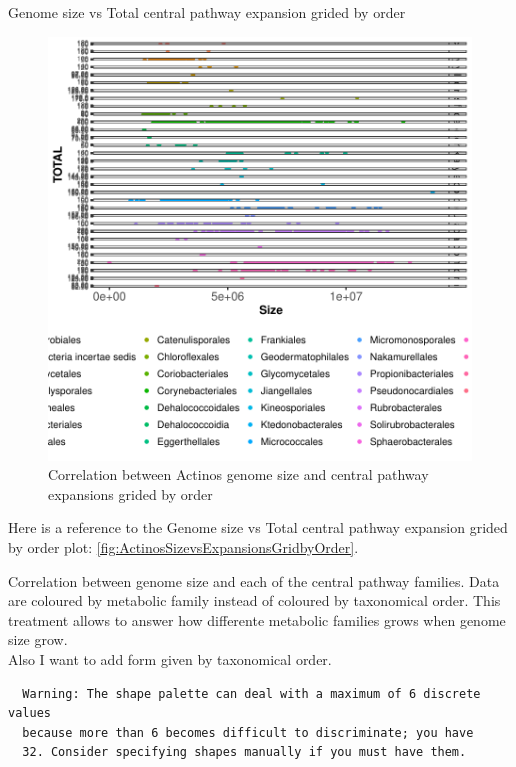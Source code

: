 \documentclass[12pt,twoside]{reedthesis}
\begin{document}
  Genome size vs Total central pathway expansion grided by order
  
  \begin{figure}[h!tbp]
  \centering
  \includegraphics[angle = 0,scale = 1]{chapter2/Actinobacteria/ActinosSizevsExpansionsGridbyOrder.pdf}
  \caption[Correlation between Actinos genome size and central pathway expansions grided by order]{\normalsize{Correlation between Actinos genome size and central pathway expansions grided by order}}
  \label{fig:ActinosSizevsExpansionsGridbyOrder}
  \end{figure}
  
  Here is a reference to the Genome size vs Total central pathway
  expansion grided by order plot:
  \autoref{fig:ActinosSizevsExpansionsGridbyOrder}. \clearpage 
  
  Correlation between genome size and each of the central pathway
  families. Data are coloured by metabolic family instead of coloured by
  taxonomical order. This treatment allows to answer how differente
  metabolic families grows when genome size grow.\\
  Also I want to add form given by taxonomical order.
  
  \begin{verbatim}
  Warning: The shape palette can deal with a maximum of 6 discrete values
  because more than 6 becomes difficult to discriminate; you have
  32. Consider specifying shapes manually if you must have them.
  \end{verbatim}
  
\end{document}
